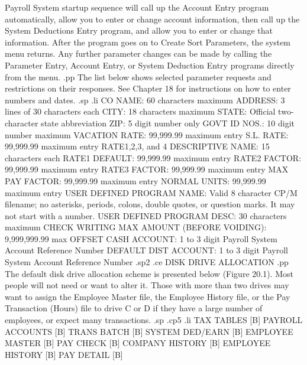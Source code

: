 Payroll System startup sequence will call up the Account Entry program
automatically, allow you to enter or change account information, then
call up the System Deductions Entry program, and allow you to enter or
change that information.  After the program goes on to Create Sort Parameters,
the system menu returns.  Any further parameter changes can be made
by calling the Parameter Entry, Account Entry, or System Deduction Entry
programs directly from the menu.
.pp
The list below shows selected parameter requests and restrictions on
their responses.  See Chapter 18 for instructions on how to enter numbers
and dates.
.sp
.li
     CO NAME: 60 characters maximum
     ADDRESS: 3 lines of 30 characters each
     CITY: 18 characters maximum
     STATE: Official two-character state abbreviation
     ZIP: 5 digit number only
     GOVT ID NOS.: 10 digit number maximum
     VACATION RATE: 99,999.99 maximum entry
     S.L. RATE: 99,999.99 maximum entry
     RATE1,2,3, and 4 DESCRIPTIVE NAME: 15 characters each
     RATE1 DEFAULT: 99,999.99 maximum entry
     RATE2 FACTOR: 99,999.99 maximum entry
     RATE3 FACTOR: 99,999.99 maximum entry
     MAX PAY FACTOR: 99,999.99 maximum entry
     NORMAL UNITS: 99,999.99 maximum entry
     USER DEFINED PROGRAM NAME: Valid 8 character CP/M filename;
       no asterisks, periods, colons, double quotes, or question
       marks. It may not start with a number.
     USER DEFINED PROGRAM DESC: 30 characters maximum
     CHECK WRITING MAX AMOUNT (BEFORE VOIDING): 9,999,999.99 max
     OFFSET CASH ACCOUNT: 1 to 3 digit Payroll System Account
       Reference Number
     DEFAULT DIST ACCOUNT: 1 to 3 digit Payroll System Account
       Reference Number
.sp2
.ce
DISK DRIVE ALLOCATION
.pp
The default disk drive allocation scheme is presented below (Figure 20.1).
Most
people will not need or want to alter it.  Those with more than
two drives may want to assign the Employee Master file, the Employee
History file, or the Pay Transaction (Hours) file to drive C or D if
they have a large number of employees, or expect many transactions.
.sp
.cp5
.li
  TAX TABLES	  [B]	PAYROLL ACCOUNTS  [B]	TRANS BATCH [B]
  SYSTEM DED/EARN [B]	EMPLOYEE MASTER   [B]	PAY CHECK   [B]
  COMPANY HISTORY [B]	EMPLOYEE HISTORY  [B]	PAY DETAIL  [B]

